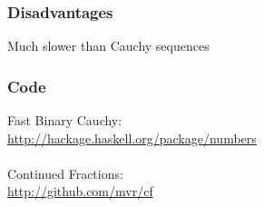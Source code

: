\documentclass[11pt]{beamer}
\begin{document}
\begin{frame}
\frametitle{Disadvantages}
Much slower than Cauchy sequences
\end{frame}

\begin{frame}
\frametitle{Code}
Fast Binary Cauchy: \\ \url{http://hackage.haskell.org/package/numbers}
\\~\\
Continued Fractions: \\ \url{http://github.com/mvr/cf}
\end{frame}

\begin{frame}
\nocite{*}
\printbibliography
\end{frame}
\end{document}
